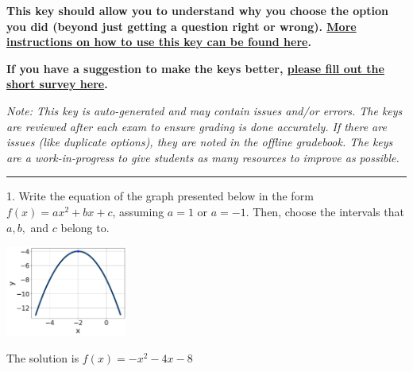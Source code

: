 \documentclass{extbook}[14pt]
\begin{document}
\textbf{This key should allow you to understand why you choose the option you did (beyond just getting a question right or wrong). \href{https://xronos.clas.ufl.edu/mac1105spring2020/courseDescriptionAndMisc/Exams/LearningFromResults}{More instructions on how to use this key can be found here}.}

\textbf{If you have a suggestion to make the keys better, \href{https://forms.gle/CZkbZmPbC9XALEE88}{please fill out the short survey here}.}

\textit{Note: This key is auto-generated and may contain issues and/or errors. The keys are reviewed after each exam to ensure grading is done accurately. If there are issues (like duplicate options), they are noted in the offline gradebook. The keys are a work-in-progress to give students as many resources to improve as possible.}

\rule{\textwidth}{0.4pt}

1. Write the equation of the graph presented below in the form $f(x)=ax^2+bx+c$, assuming  $a=1$ or $a=-1$. Then, choose the intervals that $a, b,$ and $c$ belong to.
\begin{center} \includegraphics[width=0.3\textwidth]{../Figures/quadraticGraphToEquationB.png} \end{center} 

The solution is $ f(x) = -x^{2} -4 x -8 $ 
\end{document}
